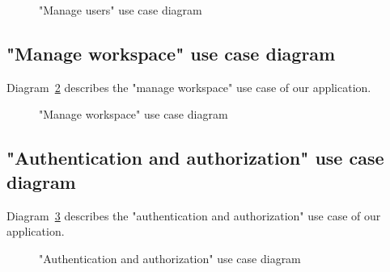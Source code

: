 \begin{figure}[H]
	\centerfloat

	\caption{"Manage users" use case diagram}
	\label{fig:manage-use-case-diagram}
\end{figure}

\subsection{"Manage workspace" use case diagram}
Diagram~\ref{fig:spaces-use-case-diagram} describes the "manage workspace" use case of our application.

\begin{figure}[H]
	\centerfloat

	\caption{"Manage workspace" use case diagram}
	\label{fig:spaces-use-case-diagram}
\end{figure}

\subsection{"Authentication and authorization" use case diagram}
Diagram~\ref{fig:auth-use-case-diagram} describes the "authentication and authorization" use case of our application.

\begin{figure}[H]
	\centerfloat

	\caption{"Authentication and authorization" use case diagram}
	\label{fig:auth-use-case-diagram}
\end{figure}






